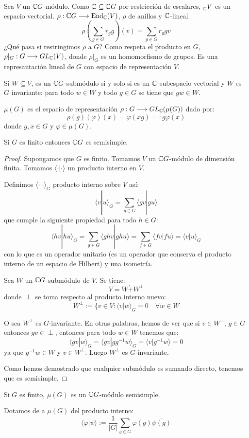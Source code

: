 Sea \(V\) un \(\mathbb{C} G\)-módulo. Como \(\mathbb{C}\subseteq\mathbb{C} G\) por restricción de
escalares, \(\prescript{}{\mathbb{C}}{V}\) es un espacio vectorial.
\(\rho:\mathbb{C} G\longrightarrow\operatorname{End}_{\mathbb{C}}(V)\), \(\rho\) de anillos y \(\mathbb{C}\)-lineal.
\[
  \rho(\sum_{g\in G} r_g g)(v)=\sum_{g\in G} r_g g v
\]
¿Qué pasa si restringimos \(\rho\) a \(G\)? Como respeta el producto en \(G\),
\(\rho|_G:G\longrightarrow GL_{\mathbb{C}}(V)\), donde \(\rho|_G\) es un homomorfismo
de grupos.
Es una represantación lineal de \(G\) con espacio de representación \(V\).

Si \(W\subseteq V\), es un \(\mathbb{C} G\)-submódulo si y solo si es un
\(\mathbb{C}\)-subespacio vectorial y \(W\) es \(G\) invariante:
para todo \(w\in W\) y todo \(g\in G\) se tiene que \(gw\in W\).

\(\mu(G)\) es el espacio de representación
\(\rho:G\longrightarrow GL_{\mathbb{C}}(\mu(G))\) dado por:
\[
  \rho(g)(\varphi)(x)=\varphi(xg)=:g\varphi(x)
\]
donde \(g,x\in G\) y \(\varphi\in\mu(G)\).

\begin{teo}
  Si \(G\) es finito entonces \(\mathbb{C} G\) es semisimple.
\end{teo}
\begin{proof}
  Supongamos que \(G\) es finito. Tomamos \(V\) un \(\mathbb{C} G\)-módulo de dimensión
  finita. Tomamos \(\langle\cdot|\cdot\rangle\) un producto interno en \(V\).

  Definimos \(\langle\cdot|\cdot\rangle_G\) producto interno sobre \(V\) así:
  \[
    \langle v|u\rangle_G=\sum_{g\in G} \langle gv| gu\rangle
  \]
  que cumple la siguiente propiedad para todo \(h\in G\):
  \[
    \langle hv|hu\rangle_G=\sum_{g\in G} \langle ghv| ghu\rangle
    =\sum_{f\in G} \langle fv| fu\rangle=\langle v|u\rangle_G
  \]
  con lo que es un operador unitario (es un operador que conserva el producto
  interno de un espacio de Hilbert) y una isometría.


  Sea \(W\) un \(\mathbb{C} G\)-submódulo de \(V\). Se tiene:
  \[
    V=W\dot{+} W^\perp
  \]
  donde \(\perp\) se toma respecto al producto interno nuevo:
  \[
    W^\perp :=\{v\in V: \langle v|w\rangle_G=0\quad\forall w\in W
  \]

  O sea \(W^\perp\) es \(G\)-invariante. En otras palabras, hemos de ver que
  si \(v\in W^\perp\), \(g\in G\) entonces \(gv\in\perp\), entonces para todo
  \(w\in W\) tenemos que:
  \[
    \langle gv|w\rangle_G=\langle gv|gg^{-1}w\rangle_G=
    \langle v|g^{-1} w\rangle=0
  \]
  ya que \(g^{-1}w\in W\) y \(v\in W^\perp\). Luego \(W^\perp\) es
  \(G\)-invariante.

  Como hemos demostrado que cualquier submódulo es sumando directo, tenemos
  que es semisimple.

\end{proof}

\begin{cor}
  Si \(G\) es finito, \(\mu(G)\) es un \(\mathbb{C} G\)-módulo semisimple.
\end{cor}

Dotamos de a \(\mu(G)\) del producto interno:
\[
  \langle \varphi|\psi\rangle:=
  \frac{1}{|G|}\sum_{g\in G}\varphi(g)\overline{\psi(g)}
\]




